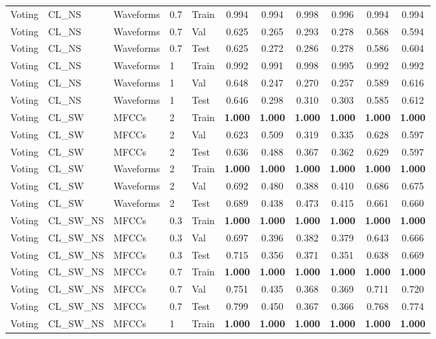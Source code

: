 \begin{landscape}
\begin{longtable}{|l|l|l|l|l|c|c|c|c|c|c|}
Voting & CL\_NS & Waveforms & 0.7 & Train & 0.994 & 0.994 & 0.998 & 0.996 & 0.994 & 0.994 \\
Voting & CL\_NS & Waveforms & 0.7 & Val & 0.625 & 0.265 & 0.293 & 0.278 & 0.568 & 0.594 \\
Voting & CL\_NS & Waveforms & 0.7 & Test & 0.625 & 0.272 & 0.286 & 0.278 & 0.586 & 0.604 \\
Voting & CL\_NS & Waveforms & 1 & Train & 0.992 & 0.991 & 0.998 & 0.995 & 0.992 & 0.992 \\
Voting & CL\_NS & Waveforms & 1 & Val & 0.648 & 0.247 & 0.270 & 0.257 & 0.589 & 0.616 \\
Voting & CL\_NS & Waveforms & 1 & Test & 0.646 & 0.298 & 0.310 & 0.303 & 0.585 & 0.612 \\
Voting & CL\_SW & MFCCs & 2 & Train & \textbf{1.000} & \textbf{1.000} & \textbf{1.000} & \textbf{1.000} & \textbf{1.000} & \textbf{1.000} \\
Voting & CL\_SW & MFCCs & 2 & Val & 0.623 & 0.509 & 0.319 & 0.335 & 0.628 & 0.597 \\
Voting & CL\_SW & MFCCs & 2 & Test & 0.636 & 0.488 & 0.367 & 0.362 & 0.629 & 0.597 \\
Voting & CL\_SW & Waveforms & 2 & Train & \textbf{1.000} & \textbf{1.000} & \textbf{1.000} & \textbf{1.000} & \textbf{1.000} & \textbf{1.000} \\
Voting & CL\_SW & Waveforms & 2 & Val & 0.692 & 0.480 & 0.388 & 0.410 & 0.686 & 0.675 \\
Voting & CL\_SW & Waveforms & 2 & Test & 0.689 & 0.438 & 0.473 & 0.415 & 0.661 & 0.660 \\
Voting & CL\_SW\_NS & MFCCs & 0.3 & Train & \textbf{1.000} & \textbf{1.000} & \textbf{1.000} & \textbf{1.000} & \textbf{1.000} & \textbf{1.000} \\
Voting & CL\_SW\_NS & MFCCs & 0.3 & Val & 0.697 & 0.396 & 0.382 & 0.379 & 0.643 & 0.666 \\
Voting & CL\_SW\_NS & MFCCs & 0.3 & Test & 0.715 & 0.356 & 0.371 & 0.351 & 0.638 & 0.669 \\
Voting & CL\_SW\_NS & MFCCs & 0.7 & Train & \textbf{1.000} & \textbf{1.000} & \textbf{1.000} & \textbf{1.000} & \textbf{1.000} & \textbf{1.000} \\
Voting & CL\_SW\_NS & MFCCs & 0.7 & Val & 0.751 & 0.435 & 0.368 & 0.369 & 0.711 & 0.720 \\
Voting & CL\_SW\_NS & MFCCs & 0.7 & Test & 0.799 & 0.450 & 0.367 & 0.366 & 0.768 & 0.774 \\
Voting & CL\_SW\_NS & MFCCs & 1 & Train & \textbf{1.000} & \textbf{1.000} & \textbf{1.000} & \textbf{1.000} & \textbf{1.000} & \textbf{1.000} \\

\end{longtable}
\end{landscape}
